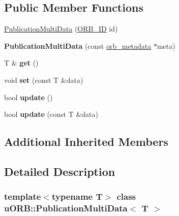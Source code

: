 \subsection*{Public Member Functions}
\begin{DoxyCompactItemize}
\item 
\hyperlink{classuORB_1_1PublicationMultiData_ae7c681d67caa481cb875aa1427dd73ec}{Publication\+Multi\+Data} (\hyperlink{uORB_8h_a96af5434ec1acdf24287bd7851b0413f}{O\+R\+B\+\_\+\+ID} id)
\item 
\mbox{\label{classuORB_1_1PublicationMultiData_ae0297ff38a92fe596256ca1f3969beea}} 
{\bfseries Publication\+Multi\+Data} (const \hyperlink{structorb__metadata}{orb\+\_\+metadata} $\ast$meta)
\item 
\mbox{\label{classuORB_1_1PublicationMultiData_ad34053c0417701f6951d21e5b6618b34}} 
T \& {\bfseries get} ()
\item 
\mbox{\label{classuORB_1_1PublicationMultiData_a7739de2d33219a5328494c4a95799725}} 
void {\bfseries set} (const T \&data)
\item 
\mbox{\label{classuORB_1_1PublicationMultiData_a42d8c47f80211bac32dfdf1792609a83}} 
bool {\bfseries update} ()
\item 
\mbox{\label{classuORB_1_1PublicationMultiData_a91f2f51e9d1b34bdec7a1db63b47ea77}} 
bool {\bfseries update} (const T \&data)
\end{DoxyCompactItemize}
\subsection*{Additional Inherited Members}


\subsection{Detailed Description}
\subsubsection*{template$<$typename T$>$\newline
class u\+O\+R\+B\+::\+Publication\+Multi\+Data$<$ T $>$}

